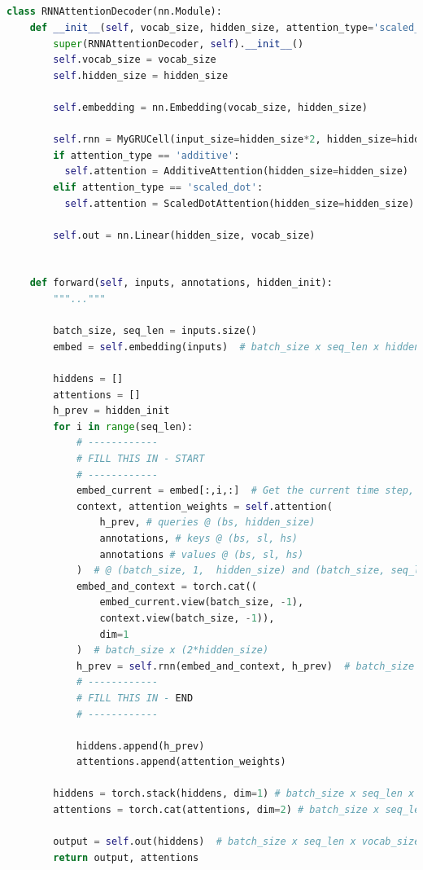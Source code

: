 \documentclass{article}
\begin{document}
	\subsection{}
\begin{lstlisting}[language=python]
class RNNAttentionDecoder(nn.Module):
    def __init__(self, vocab_size, hidden_size, attention_type='scaled_dot'):
        super(RNNAttentionDecoder, self).__init__()
        self.vocab_size = vocab_size
        self.hidden_size = hidden_size

        self.embedding = nn.Embedding(vocab_size, hidden_size)

        self.rnn = MyGRUCell(input_size=hidden_size*2, hidden_size=hidden_size)
        if attention_type == 'additive':
          self.attention = AdditiveAttention(hidden_size=hidden_size)
        elif attention_type == 'scaled_dot':
          self.attention = ScaledDotAttention(hidden_size=hidden_size)
        
        self.out = nn.Linear(hidden_size, vocab_size)

        
    def forward(self, inputs, annotations, hidden_init):
        """..."""
        
        batch_size, seq_len = inputs.size()
        embed = self.embedding(inputs)  # batch_size x seq_len x hidden_size        

        hiddens = []
        attentions = []
        h_prev = hidden_init
        for i in range(seq_len):
            # ------------
            # FILL THIS IN - START
            # ------------
            embed_current = embed[:,i,:]  # Get the current time step, across the whole batch
            context, attention_weights = self.attention(
                h_prev, # queries @ (bs, hidden_size)
                annotations, # keys @ (bs, sl, hs)
                annotations # values @ (bs, sl, hs)
            )  # @ (batch_size, 1,  hidden_size) and (batch_size, seq_len, 1)
            embed_and_context = torch.cat((
                embed_current.view(batch_size, -1),
                context.view(batch_size, -1)),
                dim=1
            )  # batch_size x (2*hidden_size) 
            h_prev = self.rnn(embed_and_context, h_prev)  # batch_size x hidden_size 
            # ------------
            # FILL THIS IN - END
            # ------------    
            
            hiddens.append(h_prev)
            attentions.append(attention_weights)

        hiddens = torch.stack(hiddens, dim=1) # batch_size x seq_len x hidden_size
        attentions = torch.cat(attentions, dim=2) # batch_size x seq_len x seq_len
        
        output = self.out(hiddens)  # batch_size x seq_len x vocab_size
        return output, attentions
\end{lstlisting}
\end{document}
